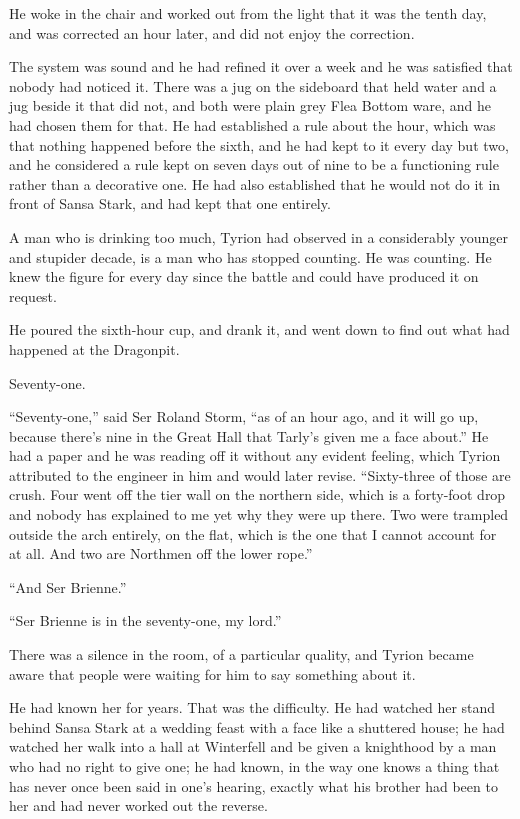 He woke in the chair and worked out from the light that it was the tenth day, and was corrected an hour later, and did not enjoy the correction.

The system was sound and he had refined it over a week and he was satisfied that nobody had noticed it. There was a jug on the sideboard that held water and a jug beside it that did not, and both were plain grey Flea Bottom ware, and he had chosen them for that. He had established a rule about the hour, which was that nothing happened before the sixth, and he had kept to it every day but two, and he considered a rule kept on seven days out of nine to be a functioning rule rather than a decorative one. He had also established that he would not do it in front of Sansa Stark, and had kept that one entirely.

A man who is drinking too much, Tyrion had observed in a considerably younger and stupider decade, is a man who has stopped counting. He was counting. He knew the figure for every day since the battle and could have produced it on request.

He poured the sixth-hour cup, and drank it, and went down to find out what had happened at the Dragonpit.

\sceneBreak

Seventy-one.

“Seventy-one,” said Ser Roland Storm, “as of an hour ago, and it will go up, because there’s nine in the Great Hall that Tarly’s given me a face about.” He had a paper and he was reading off it without any evident feeling, which Tyrion attributed to the engineer in him and would later revise. “Sixty-three of those are crush. Four went off the tier wall on the northern side, which is a forty-foot drop and nobody has explained to me yet why they were up there. Two were trampled outside the arch entirely, on the flat, which is the one that I cannot account for at all. And two are Northmen off the lower rope.”

“And Ser Brienne.”

“Ser Brienne is in the seventy-one, my lord.”

There was a silence in the room, of a particular quality, and Tyrion became aware that people were waiting for him to say something about it.

He had known her for years. That was the difficulty. He had watched her stand behind Sansa Stark at a wedding feast with a face like a shuttered house; he had watched her walk into a hall at Winterfell and be given a knighthood by a man who had no right to give one; he had known, in the way one knows a thing that has never once been said in one’s hearing, exactly what his brother had been to her and had never worked out the reverse.

